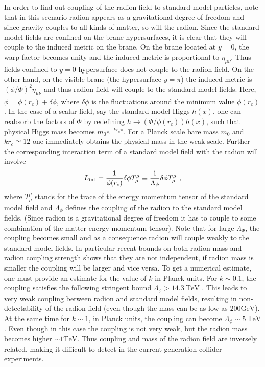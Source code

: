\documentclass{article}
\begin{document}
In order to find out coupling of the radion field to standard model particles, note that in this scenario radion appears as a gravitational degree of freedom and since gravity couples to all kinds of matter, so will the radion. Since the standard model fields are confined on the brane hypersurfaces, it is clear that they will couple to the induced metric on the brane. On the brane located at $y=0$, the warp factor becomes unity and the induced metric is proportional to $\eta _{\mu \nu}$. Thus fields confined to $y=0$ hypersurface does not couple to the radion field. On the other hand, on the visible brane (the hypersurface $y=\pi$) the induced metric is $(\phi/\Phi)^{2}\eta _{\mu \nu}$ and thus radion field will couple to the standard model fields. Here, $\phi=\phi(r_{c})+\delta \phi$, where $\delta \phi$ is the fluctuations around the minimum value $\phi(r_{c})$. In the case of a scalar field, say the standard model Higgs $h(x)$, one can reabsorb the factors of $\Phi$ by redefining $h\rightarrow (\Phi/\phi(
r_{c}))h(x)$, such that physical Higgs mass becomes $m_{0}e^{-kr_{c}\pi}$. For a Planck 
scale bare mass $m_{0}$ and $kr_{c}\simeq 12$ one immediately obtains the physical mass in the weak scale. Further the corresponding interaction term of a standard model field with the radion will involve 
\begin{align}
L_{\rm int}=\frac{1}{\phi(r_{c})}\delta \phi T^{\mu}_{\mu}\equiv \frac{1}{\Lambda _{\phi}}\delta \phi T^{\mu}_{\mu}~,
\end{align}
where $T^{\mu}_{\mu}$ stands for the trace of the energy momentum tensor of the standard model field and $\Lambda _{\phi}$ defines the coupling of the radion to the standard model fields. (Since radion is a gravitational degree of freedom it has to couple to some combination of the matter energy momentum tensor). Note that for large $\Lambda _{\Phi}$, the coupling becomes small and as a consequence radion will couple weakly to the standard model fields. In particular recent bounds on both radion mass and radion coupling strength shows that they are not independent, if radion mass is smaller the coupling will be larger and vice versa. To get a numerical estimate, one must provide an estimate for the value of $k$ in Planck units. For $k\sim 0.1$, the coupling satisfies the following stringent bound $\Lambda _{\phi}>14.3~\textrm{TeV}$ \cite{Cho:2013mva,CMS:ril,Davoudiasl:2012xd,Kubota:2012in,Frank:2011kz,Mahanta:2000ci}. This leads to very weak coupling between radion and standard model fields, 
resulting in non-detectability of the radion field (even though the mass can be as low 
as $200 \textrm{GeV}$). At the same time for $k\sim 1$, in Planck units, the coupling can become $\Lambda _{\phi}\sim 5~\textrm{TeV}$. Even though in this case the coupling is not very weak, but the radion mass becomes higher $\sim 1 \textrm{TeV}$. Thus coupling and mass of the radion field are inversely related, making it difficult to detect in the current generation collider experiments. 
\end{document}
